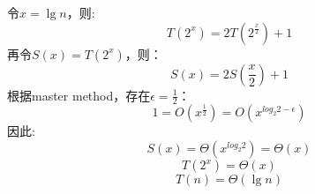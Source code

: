 \begin{solution}
    令$x=\lg n$，则:
    $$T(2^{x}) = 2T(2^{\frac x 2}) + 1$$
    再令$S(x)=T(2^{x})$，则：
    $$S(x) = 2S(\frac x 2) + 1$$
    根据master method，存在$\epsilon=\frac 1 2$：
    $$1 = O(x^{\frac 1 2}) = O(x^{log_2{2}-\epsilon})$$
    因此:
    $$S(x)=\Theta(x^{log_2{2}}) = \Theta(x)$$
    $$T(2^{x})=\Theta(x)$$
    $$T(n)=\Theta(\lg n)$$
\end{solution}